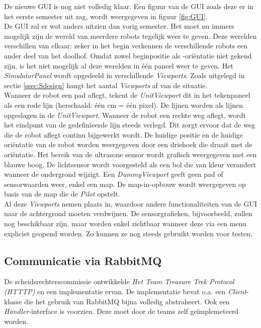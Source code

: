 \documentclass[tt2]{penoverslag}
\begin{document}
De nieuwe GUI is nog niet volledig klaar. Een figuur van de GUI zoals deze er in het eerste semester uit zag, wordt weergegeven in figuur \ref{fig:GUI}.\\

De GUI zal er wat anders uitzien dan vorig semester. Het moet nu immers mogelijk zijn de wereld van meerdere robots tegelijk weer te geven. Deze werelden verschillen van elkaar: zeker in het begin verkennen de verschillende robots een ander deel van het doolhof. Omdat zowel beginpositie als -ori\"entatie niet gekend zijn, is het niet mogelijk al deze werelden in \'e\'en paneel weer te geven. Het \textit{SimulatorPanel} wordt opgedeeld in verschillende \textit{Viewports}. Zoals uitgelegd in sectie \ref{ssec:Sdesign} hangt het aantal \textit{Viewports} af van de situatie.\\

Wanneer de robot een pad aflegt, tekent de \textit{UnitViewport} dit in het tekenpaneel als een rode lijn (herschaald: \'e\'en cm = \'e\'en pixel). De lijnen worden als lijnen opgeslagen in de \textit{UnitViewport}. Wanneer de robot een rechte weg aflegt, wordt het eindpunt van de gedefinieerde lijn steeds verlegd. Dit zorgt ervoor dat de weg die de robot aflegt continu bijgewerkt wordt. De huidige positie en de huidige ori\"entatie van de robot worden weergegeven door een driehoek die draait met de ori\"entatie. Het bereik van de ultrasone sensor wordt grafisch weergegeven met een blauwe boog. De lichtsensor wordt voorgesteld als een bol die van kleur verandert wanneer de ondergrond wijzigt. 
Een \textit{DummyViewport} geeft geen pad of sensorwaarden weer, enkel een map. De map-in-opbouw wordt weergegeven op basis van de map die de \textit{Pilot} opstelt.\\

Al deze \textit{Viewports} nemen plaats in, waardoor andere functionaliteiten van de GUI naar de achtergrond moeten verdwijnen. De sensorgrafieken, bijvoorbeeld, zullen nog beschikbaar zijn, maar worden enkel zichtbaar wanneer deze via een menu expliciet geopend worden. Zo kunnen ze nog steeds gebruikt worden voor testen.



\subsection{Communicatie via RabbitMQ}
\label{ssec:RabbMQ}
De scheidsrechterscommissie ontwikkelde \textit{Het Team Treasure Trek Protocol (HTTTP)} en een implementatie ervan. De implementatie bevat o.a. een \textit{Client}-klasse die het gebruik van RabbitMQ bijna volledig abstraheert. Ook een \textit{Handler}-interface is voorzien. Deze moet door de teams zelf ge\"implemeteerd worden.\\
\end{document}
